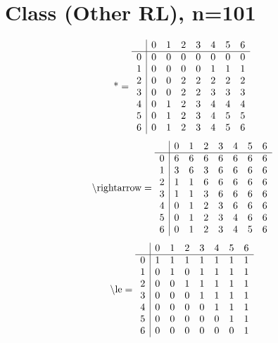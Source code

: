 \documentclass[11pt]{article}
\begin{document}
\section{Class (Other RL), n=101}
\[\text{*} = 
\begin{array}{r | r r r r r r r}
 & 0 & 1 & 2 & 3 & 4 & 5 & 6 \\ \hline
0 & 0 & 0 & 0 & 0 & 0 & 0 & 0 \\
1 & 0 & 0 & 0 & 0 & 1 & 1 & 1 \\
2 & 0 & 0 & 2 & 2 & 2 & 2 & 2 \\
3 & 0 & 0 & 2 & 2 & 3 & 3 & 3 \\
4 & 0 & 1 & 2 & 3 & 4 & 4 & 4 \\
5 & 0 & 1 & 2 & 3 & 4 & 5 & 5 \\
6 & 0 & 1 & 2 & 3 & 4 & 5 & 6 \\
\end{array}
\]
\[\text{\textbackslash rightarrow} = 
\begin{array}{r | r r r r r r r}
 & 0 & 1 & 2 & 3 & 4 & 5 & 6 \\ \hline
0 & 6 & 6 & 6 & 6 & 6 & 6 & 6 \\
1 & 3 & 6 & 3 & 6 & 6 & 6 & 6 \\
2 & 1 & 1 & 6 & 6 & 6 & 6 & 6 \\
3 & 1 & 1 & 3 & 6 & 6 & 6 & 6 \\
4 & 0 & 1 & 2 & 3 & 6 & 6 & 6 \\
5 & 0 & 1 & 2 & 3 & 4 & 6 & 6 \\
6 & 0 & 1 & 2 & 3 & 4 & 5 & 6 \\
\end{array}
\]
\[\text{\textbackslash le} = 
\begin{array}{r | r r r r r r r}
 & 0 & 1 & 2 & 3 & 4 & 5 & 6 \\ \hline
0 & 1 & 1 & 1 & 1 & 1 & 1 & 1 \\
1 & 0 & 1 & 0 & 1 & 1 & 1 & 1 \\
2 & 0 & 0 & 1 & 1 & 1 & 1 & 1 \\
3 & 0 & 0 & 0 & 1 & 1 & 1 & 1 \\
4 & 0 & 0 & 0 & 0 & 1 & 1 & 1 \\
5 & 0 & 0 & 0 & 0 & 0 & 1 & 1 \\
6 & 0 & 0 & 0 & 0 & 0 & 0 & 1 \\
\end{array}
\]
\end{document}
